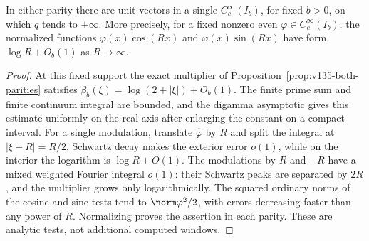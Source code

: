 \begin{lemma}
\label{lem:ns47-high-frequency}
In either parity there are unit vectors in a single
$C_c^\infty(I_b)$, for fixed $b>0$, on which $q$ tends to $+\infty$.
More precisely, for a fixed nonzero even $\varphi\in C_c^\infty(I_b)$,
the normalized functions $\varphi(x)\cos(Rx)$ and
$\varphi(x)\sin(Rx)$ have form $\log R+O_b(1)$ as $R\to\infty$.
\end{lemma}
\begin{proof}
At this fixed support the exact multiplier of
Proposition~\ref{prop:v135-both-parities} satisfies
$\beta_b(\xi)=\log(2+|\xi|)+O_b(1)$. The finite prime sum and
finite continuum integral are bounded, and the digamma asymptotic
gives this estimate uniformly on the real axis after enlarging the
constant on a compact interval. For a single modulation, translate
$\widehat\varphi$ by $R$ and split the integral at
$|\xi-R|=R/2$. Schwartz decay makes the exterior error $o(1)$,
while on the interior the logarithm is $\log R+O(1)$.
The modulations by $R$ and $-R$ have a mixed weighted Fourier
integral $o(1)$: their Schwartz peaks are separated by $2R$, and
the multiplier grows only logarithmically. The squared ordinary
norms of the cosine and sine tests tend to
$\norm\varphi^2/2$, with errors decreasing faster than any power
of $R$. Normalizing proves the assertion in each parity. These are
analytic tests, not additional computed windows.
\end{proof}

